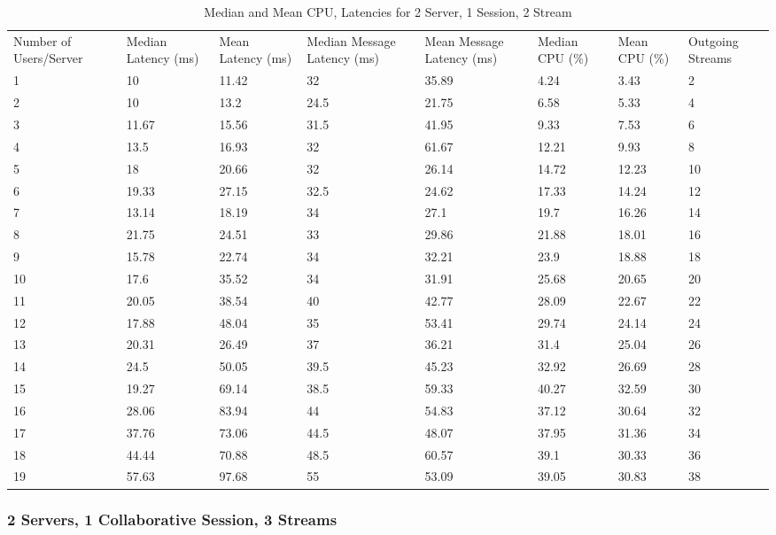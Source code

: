 \begin{table}
\caption{Median and Mean CPU, Latencies for 2 Server, 1 Session, 2 Stream}
\label{table:2serv_1sess_2str}
\begin{tabu} to\linewidth{|X[c]|X[c]|X[c]|X[c]|X[c]|X[c]|X[c]|X[c]|}
\everyrow{\hline}
\hline
Number of Users/Server & Median Latency (ms) & Mean Latency (ms) & Median Message Latency (ms) & Mean Message Latency (ms) & Median CPU (\%) & Mean CPU (\%) & Outgoing Streams\\
1 & 10 & 11.42 & 32 & 35.89 & 4.24 & 3.43 & 2 \\
2 & 10 & 13.2 & 24.5 & 21.75 & 6.58 & 5.33 & 4 \\
3 & 11.67 & 15.56 & 31.5 & 41.95 & 9.33 & 7.53 & 6 \\
4 & 13.5 & 16.93 & 32 & 61.67 & 12.21 & 9.93 & 8 \\
5 & 18 & 20.66 & 32 & 26.14 & 14.72 & 12.23 & 10 \\
6 & 19.33 & 27.15 & 32.5 & 24.62 & 17.33 & 14.24 & 12 \\
7 & 13.14 & 18.19 & 34 & 27.1 & 19.7 & 16.26 & 14 \\
8 & 21.75 & 24.51 & 33 & 29.86 & 21.88 & 18.01 & 16 \\
9 & 15.78 & 22.74 & 34 & 32.21 & 23.9 & 18.88 & 18 \\
10 & 17.6 & 35.52 & 34 & 31.91 & 25.68 & 20.65 & 20 \\
11 & 20.05 & 38.54 & 40 & 42.77 & 28.09 & 22.67 & 22 \\
12 & 17.88 & 48.04 & 35 & 53.41 & 29.74 & 24.14 & 24 \\
13 & 20.31 & 26.49 & 37 & 36.21 & 31.4 & 25.04 & 26 \\
14 & 24.5 & 50.05 & 39.5 & 45.23 & 32.92 & 26.69 & 28 \\
15 & 19.27 & 69.14 & 38.5 & 59.33 & 40.27 & 32.59 & 30 \\
16 & 28.06 & 83.94 & 44 & 54.83 & 37.12 & 30.64 & 32 \\
17 & 37.76 & 73.06 & 44.5 & 48.07 & 37.95 & 31.36 & 34 \\
18 & 44.44 & 70.88 & 48.5 & 60.57 & 39.1 & 30.33 & 36 \\
19 & 57.63 & 97.68 & 55 & 53.09 & 39.05 & 30.83 & 38 \\
\end{tabu}
\end{table}

\clearpage\subsubsection{2 Servers, 1 Collaborative Session, 3 Streams}

